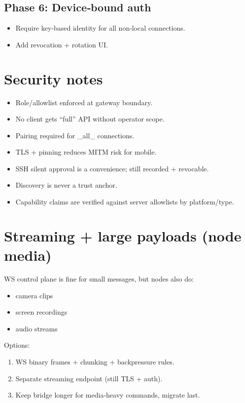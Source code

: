 \subsection{Phase 6: Device‑bound auth}


\begin{itemize}
  \item Require key‑based identity for all non‑local connections.
  \item Add revocation + rotation UI.
\end{itemize}


\hrulefill


\section{Security notes}


\begin{itemize}
  \item Role/allowlist enforced at gateway boundary.
  \item No client gets “full” API without operator scope.
  \item Pairing required for \_all\_ connections.
  \item TLS + pinning reduces MITM risk for mobile.
  \item SSH silent approval is a convenience; still recorded + revocable.
  \item Discovery is never a trust anchor.
  \item Capability claims are verified against server allowlists by platform/type.
\end{itemize}


\section{Streaming + large payloads (node media)}


WS control plane is fine for small messages, but nodes also do:

\begin{itemize}
  \item camera clips
  \item screen recordings
  \item audio streams
\end{itemize}


Options:

\begin{enumerate}
  \item WS binary frames + chunking + backpressure rules.
  \item Separate streaming endpoint (still TLS + auth).
  \item Keep bridge longer for media‑heavy commands, migrate last.
\end{enumerate}



